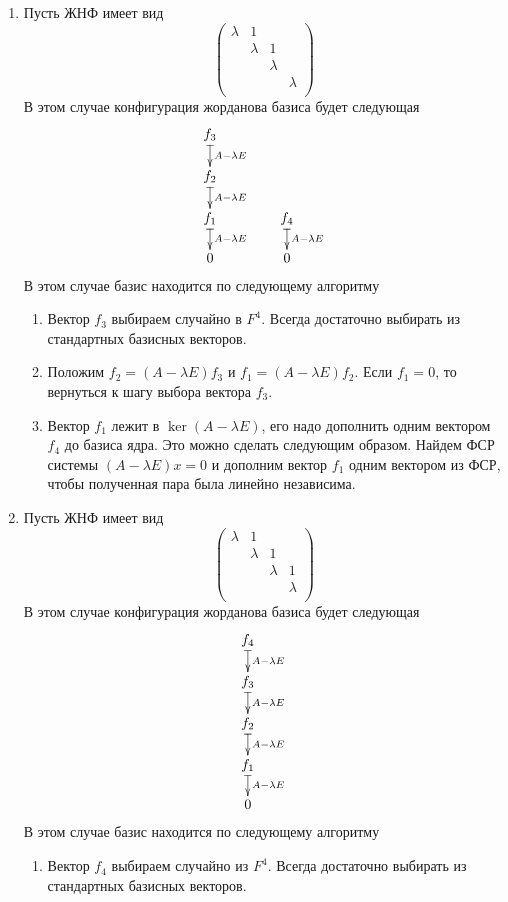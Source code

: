 \documentclass{article}
\begin{document}
\begin{enumerate}
\item Пусть ЖНФ имеет вид
\[
\begin{pmatrix}
{\lambda}&{1}&{}&{}\\
{}&{\lambda}&{1}&{}\\
{}&{}&{\lambda}&{}\\
{}&{}&{}&{\lambda}\\
\end{pmatrix}
\]
В этом случае конфигурация жорданова базиса будет следующая
\[
\xymatrix@R=15pt@C=40pt{
  {f_3}\ar@{|->}[d]^{A-\lambda E}&{}\\
  {f_2}\ar@{|->}[d]^{A-\lambda E}&{}\\
  {f_1}\ar@{|->}[d]^{A-\lambda E}&{f_4}\ar@{|->}[d]^{A-\lambda E}\\
  {0}&{0}
}
\]
В этом случае базис находится по следующему алгоритму
\begin{enumerate}
\item Вектор $f_3$ выбираем случайно в $F^4$. Всегда достаточно выбирать из стандартных базисных векторов.

\item Положим $f_2 = (A - \lambda E) f_3$ и $f_1 = (A - \lambda E) f_2$. Если $f_1 = 0$, то вернуться к шагу выбора вектора $f_3$.

\item Вектор $f_1$ лежит в $\ker (A - \lambda E)$, его надо дополнить одним вектором $f_4$ до базиса ядра. Это можно сделать следующим образом. Найдем ФСР системы $(A - \lambda E)x = 0$ и дополним вектор $f_1$ одним вектором из ФСР, чтобы полученная пара была линейно независима.
\end{enumerate}

\item Пусть ЖНФ имеет вид
\[
\begin{pmatrix}
{\lambda}&{1}&{}&{}\\
{}&{\lambda}&{1}&{}\\
{}&{}&{\lambda}&{1}\\
{}&{}&{}&{\lambda}\\
\end{pmatrix}
\]
В этом случае конфигурация жорданова базиса будет следующая
\[
\xymatrix@R=15pt@C=40pt{
  {f_4}\ar@{|->}[d]^{A-\lambda E}\\
  {f_3}\ar@{|->}[d]^{A-\lambda E}\\
  {f_2}\ar@{|->}[d]^{A-\lambda E}\\
  {f_1}\ar@{|->}[d]^{A-\lambda E}\\
  {0}
}
\]
В этом случае базис находится по следующему алгоритму
\begin{enumerate}
\item Вектор $f_4$ выбираем случайно из $F^4$. Всегда достаточно выбирать из стандартных базисных векторов.


\end{enumerate}
\end{enumerate}
\end{document}
